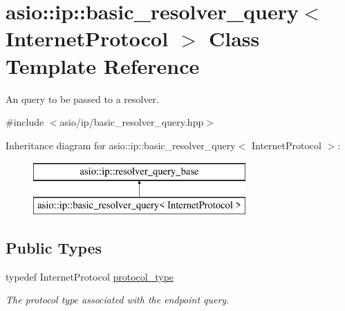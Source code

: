 \hypertarget{classasio_1_1ip_1_1basic__resolver__query}{}\section{asio\+:\+:ip\+:\+:basic\+\_\+resolver\+\_\+query$<$ Internet\+Protocol $>$ Class Template Reference}
\label{classasio_1_1ip_1_1basic__resolver__query}


An query to be passed to a resolver.  




{\ttfamily \#include $<$asio/ip/basic\+\_\+resolver\+\_\+query.\+hpp$>$}

Inheritance diagram for asio\+:\+:ip\+:\+:basic\+\_\+resolver\+\_\+query$<$ Internet\+Protocol $>$\+:\begin{figure}[H]
\begin{center}
\leavevmode
\includegraphics[height=2.000000cm]{classasio_1_1ip_1_1basic__resolver__query}
\end{center}
\end{figure}
\subsection*{Public Types}
\begin{DoxyCompactItemize}
\item 
typedef Internet\+Protocol \hyperlink{classasio_1_1ip_1_1basic__resolver__query_afc47f8001caf9274f6f567ae541e224a}{protocol\+\_\+type}
\begin{DoxyCompactList}\small\item\em The protocol type associated with the endpoint query. \end{DoxyCompactList}\end{DoxyCompactItemize}
